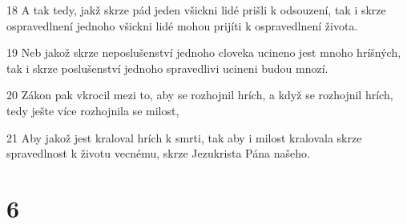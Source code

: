 \par 18 A tak tedy, jakž skrze pád jeden všickni lidé prišli k odsouzení, tak i skrze ospravedlnení jednoho všickni lidé mohou prijíti k ospravedlnení života.
\par 19 Neb jakož skrze neposlušenství jednoho cloveka ucineno jest mnoho hríšných, tak i skrze poslušenství jednoho spravedlivi ucineni budou mnozí.
\par 20 Zákon pak vkrocil mezi to, aby se rozhojnil hrích, a když se rozhojnil hrích, tedy ješte více rozhojnila se milost,
\par 21 Aby jakož jest kraloval hrích k smrti, tak aby i milost kralovala skrze spravedlnost k životu vecnému, skrze Jezukrista Pána našeho.

\chapter{6}

